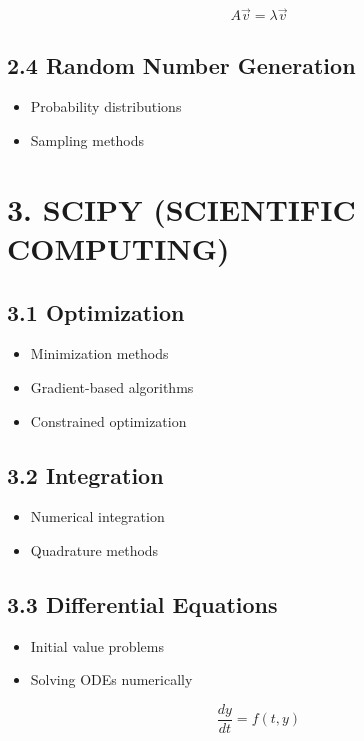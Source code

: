\[
A \vec{v} = \lambda \vec{v}
\]

\subsection*{2.4 Random Number Generation}

\begin{itemize}
\item Probability distributions
\item Sampling methods
\end{itemize}

\vspace{0.5cm}

\section*{3. SCIPY (SCIENTIFIC COMPUTING)}

\subsection*{3.1 Optimization}

\begin{itemize}
\item Minimization methods
\item Gradient-based algorithms
\item Constrained optimization
\end{itemize}

\subsection*{3.2 Integration}

\begin{itemize}
\item Numerical integration
\item Quadrature methods
\end{itemize}

\subsection*{3.3 Differential Equations}

\begin{itemize}
\item Initial value problems
\item Solving ODEs numerically
\end{itemize}

\[
\frac{dy}{dt} = f(t,y)
\]

